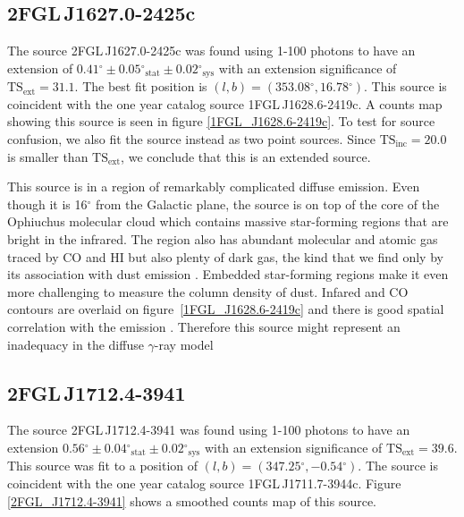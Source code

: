 \documentclass[12pt,preprint]{aastex}
\newcommand{\gev}{\text{GeV}\xspace}
\newcommand{\tsext}{{\ensuremath{\text{TS}_{\text{ext}}}}\xspace}
\newcommand{\tsinc}{\ensuremath{\text{TS}_{\text{inc}}}\xspace}
\newcommand{\sys}{\text{sys}\xspace}
\newcommand{\stat}{\text{stat}\xspace}
\renewcommand{\deg}{\ensuremath{^\circ}\xspace}
\begin{document}
\subsection{2FGL\,J1627.0-2425c}
\label{section_2FGL_J1627.0-2425c}


The source 2FGL\,J1627.0-2425c was found using 1-100 \gev photons to
have an extension of $0.41\deg\pm0.05\deg_\stat\pm0.02\deg_\sys$ with
an extension significance of $\tsext=31.1$.  The best fit position is
$(l,b)=(353.08\deg, 16.78\deg)$.  This source is coincident with the one
year catalog source 1FGL\,J1628.6-2419c.  A counts map showing this source
is seen in figure \ref{1FGL_J1628.6-2419c}.  To test for source confusion,
we also fit the source instead as two point sources. Since $\tsinc=20.0$
is smaller than \tsext, we conclude that this is an extended source.

\begin{shaded}
This source is in a region of remarkably complicated diffuse emission.
Even though it is 16\deg from the Galactic plane, the source is on
top of the core of the Ophiuchus molecular cloud which contains massive
star-forming regions that are bright in the infrared.  The region also has
abundant molecular and atomic gas traced by CO and HI but also plenty of
dark gas, the kind that we find only by its association with dust emission
\citep{isabelle_dark_gass}. Embedded star-forming regions make it even
more challenging to measure the column density of dust.  Infared and CO
contours are overlaid on figure~\ref{1FGL_J1628.6-2419c} and there is good
spatial correlation with the \gev emission \citep{iras_rho_ophiuci}.
Therefore this source might represent an inadequacy in the diffuse
$\gamma$-ray model
\end{shaded}

\subsection{2FGL\,J1712.4-3941}
\label{section_2FGL_J1712.4-3941}


The source 2FGL\,J1712.4-3941 was found using 1-100 \gev
photons to have an extension $0.56\deg\pm0.04\deg_\stat\pm0.02\deg_\sys$
with an extension significance of $\tsext=39.6$.  This source was
fit to a position of $(l,b)=(347.25\deg,-0.54\deg)$.  The source
is coincident with the one year catalog source 1FGL\,J1711.7-3944c.
Figure \ref{2FGL_J1712.4-3941} shows a smoothed counts map of this source.
\end{document}
